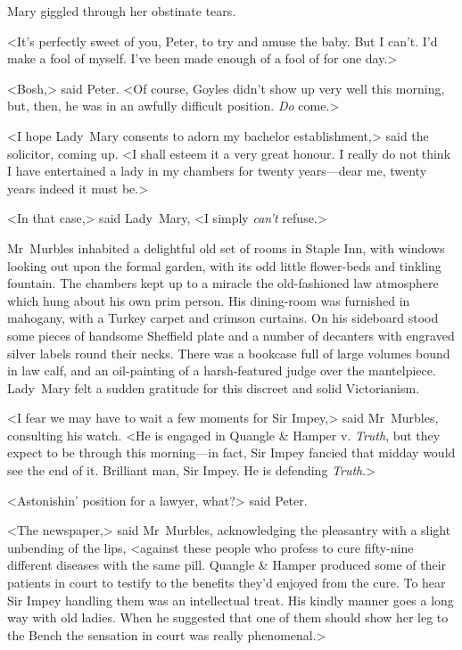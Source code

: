 Mary giggled through her obstinate tears.

<It's perfectly sweet of you, Peter, to try and amuse the baby. But I can't. I'd make a fool of myself. I've been made enough of a fool of for one day.>

<Bosh,> said Peter. <Of course, Goyles didn't show up very well this morning, but, then, he was in an awfully difficult position. \emph{Do} come.>

<I hope Lady~Mary consents to adorn my bachelor establishment,> said the solicitor, coming up. <I shall esteem it a very great honour. I really do not think I have entertained a lady in my chambers for twenty years—dear me, twenty years indeed it must be.>

<In that case,> said Lady~Mary, <I simply \emph{can't} refuse.>

Mr~Murbles inhabited a delightful old set of rooms in Staple Inn, with windows looking out upon the formal garden, with its odd little flower-beds and tinkling fountain. The chambers kept up to a miracle the old-fashioned law atmosphere which hung about his own prim person.  His dining-room was furnished in mahogany, with a Turkey carpet and crimson curtains. On his sideboard stood some pieces of handsome Sheffield plate and a number of decanters with engraved silver labels round their necks. There was a bookcase full of large volumes bound in law calf, and an oil-painting of a harsh-featured judge over the mantelpiece. Lady~Mary felt a sudden gratitude for this discreet and solid Victorianism.

<I fear we may have to wait a few moments for Sir Impey,> said Mr~Murbles, consulting his watch. <He is engaged in Quangle \& Hamper v.  \textit{Truth}, but they expect to be through this morning—in fact, Sir Impey fancied that midday would see the end of it. Brilliant man, Sir Impey.  He is defending \textit{Truth}.>

<Astonishin' position for a lawyer, what?> said Peter.

<The newspaper,> said Mr~Murbles, acknowledging the pleasantry with a slight unbending of the lips, <against these people who profess to cure fifty-nine different diseases with the same pill. Quangle \& Hamper produced some of their patients in court to testify to the benefits they'd enjoyed from the cure. To hear Sir Impey handling them was an intellectual treat. His kindly manner goes a long way with old ladies.  When he suggested that one of them should show her leg to the Bench the sensation in court was really phenomenal.>

